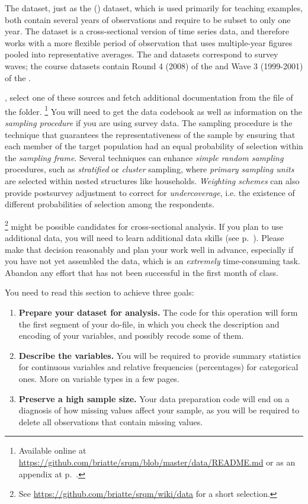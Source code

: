 The \GSS dataset, just as the \nhis (\NHIS) dataset, which is used primarily for teaching examples, both contain several years of observations and require to be subset to only one year. The \QOG dataset is a cross-sectional version of time series data, and therefore works with a more flexible period of observation that uses multiple-year figures pooled into representative averages. The \ESS and \WVS datasets correspond to survey waves; the course datasets contain Round 4 (2008) of the \ess and Wave 3 (1999-2001) of the \wvs.

, select one of these sources and fetch additional documentation from the \README file of the \data folder.%
  \footnote{\label{data-readme}Available online at \url{https://github.com/briatte/srqm/blob/master/data/README.md} or as an appendix at p.~\pageref{ch:data-sources}.} %
%
You will need to get the data codebook as well as information on the \emph{sampling procedure} if you are using survey data. The sampling procedure is the technique that guarantees the representativeness of the sample by ensuring that each member of the target population had an equal probability of selection within the \emph{sampling frame}. Several techniques can enhance \emph{simple random sampling} procedures, such as \emph{stratified} or \emph{cluster} sampling, where \emph{primary sampling units} are selected within nested structures like households. \emph{Weighting schemes} can also provide postsurvey adjustment to correct for \emph{undercoverage}, i.e. the existence of different probabilities of selection among the respondents.

%
	\label{external-data-warning}%
	\footnote{See \url{https://github.com/briatte/srqm/wiki/data} for a short selection.} %
		might be possible candidates for cross-sectional analysis. %
		If you plan to use additional data, you will need to learn additional data skills (see p.~\pageref{sec:additional-data-skills}). Please make that decision reasonably and plan your work well in advance, especially if you have not yet assembled the data, which is an \emph{extremely} time-consuming task. Abandon any effort that has not been successful in the first month of class.

You need to read this section to achieve three goals:

\begin{enumerate}
	\item \textbf{Prepare your dataset for analysis.} The code for this operation will form the first segment of your do-file, in which you check the description and encoding of your variables, and possibly recode some of them.
	\item \textbf{Describe the variables.} You will be required to provide summary statistics for continuous variables and relative frequencies (percentages) for categorical ones. More on variable types in a few pages.
	\item \textbf{Preserve a high sample size.} Your data preparation code will end on a diagnosis of how missing values affect your sample, as you will be required to delete all observations that contain missing values.
\end{enumerate}
   
